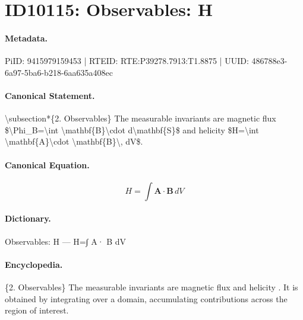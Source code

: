 \section*{ID10115: Observables: H}
\paragraph{Metadata.}
PiID: 9415979159453 | RTEID: RTE:P39278.7913:T1.8875 | UUID: 486788e3-6a97-5ba6-b218-6aa635a408ec

\paragraph{Canonical Statement.}
\textbackslash{}subsection*\{2. Observables\} The measurable invariants are magnetic flux \$\textbackslash{}Phi\_B=\textbackslash{}int \textbackslash{}mathbf\{B\}\textbackslash{}cdot d\textbackslash{}mathbf\{S\}\$ and helicity \$H=\textbackslash{}int \textbackslash{}mathbf\{A\}\textbackslash{}cdot \textbackslash{}mathbf\{B\}\textbackslash{}, dV\$.

\paragraph{Canonical Equation.}
\[
H=\int \mathbf{A}\cdot \mathbf{B}\, dV
\]

\paragraph{Dictionary.}
Observables: H — H=∫ A· B dV

\paragraph{Encyclopedia.}
\{2. Observables\} The measurable invariants are magnetic flux and helicity . It is obtained by integrating over a domain, accumulating contributions across the region of interest.
